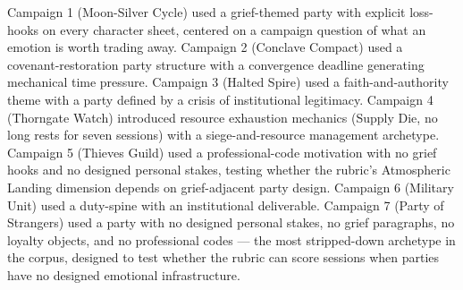 Campaign 1 (Moon-Silver Cycle) used a grief-themed party with explicit loss-hooks on
every character sheet, centered on a campaign question of what an emotion is worth
trading away. Campaign 2 (Conclave Compact) used a covenant-restoration party
structure with a convergence deadline generating mechanical time pressure. Campaign 3
(Halted Spire) used a faith-and-authority theme with a party defined by a crisis of
institutional legitimacy. Campaign 4 (Thorngate Watch) introduced resource exhaustion
mechanics (Supply Die, no long rests for seven sessions) with a siege-and-resource
management archetype. Campaign 5 (Thieves Guild) used a professional-code motivation
with no grief hooks and no designed personal stakes, testing whether the rubric's
Atmospheric Landing dimension depends on grief-adjacent party design. Campaign 6
(Military Unit) used a duty-spine with an institutional deliverable. Campaign 7 (Party
of Strangers) used a party with no designed personal stakes, no grief paragraphs, no
loyalty objects, and no professional codes --- the most stripped-down archetype in the
corpus, designed to test whether the rubric can score sessions when parties have no
designed emotional infrastructure.

